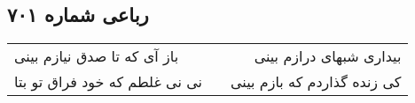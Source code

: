 \begin{center}
\section*{رباعی شماره ۷۰۱}
\label{sec:sh701}
\begin{longtable}{l p{0.5cm} r}
باز آی که تا صدق نیازم بینی
&&
بیداری شبهای درازم بینی
\\
نی نی غلطم که خود فراق تو بتا
&&
کی زنده گذاردم که بازم بینی
\\
\end{longtable}
\end{center}
